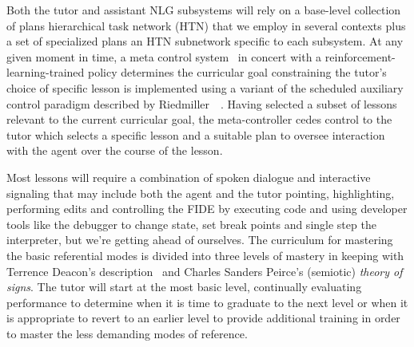 Both the tutor and assistant NLG subsystems will rely on a base-level collection of plans \emdash{} hierarchical task network (HTN) \emdash{} that we employ in several contexts plus a set of specialized plans \emdash{} an HTN subnetwork \emdash{} specific to each subsystem. At any given moment in time, a meta control system~\cite{HamricketalCoRR-17} in concert with a reinforcement-learning-trained policy determines the curricular goal constraining the tutor's choice of specific lesson is implemented using a variant of the scheduled auxiliary control paradigm described by Riedmiller~\etal{}~\cite{RiedmilleretalCoRR-18}. Having selected a subset of lessons relevant to the current curricular goal, the meta-controller cedes control to the tutor which selects a specific lesson and a suitable plan to oversee interaction with the agent over the course of the lesson.

Most lessons will require a combination of spoken dialogue and interactive signaling that may include both the agent and the tutor pointing, highlighting, performing edits and controlling the FIDE by executing code and using developer tools like the debugger to change state, set break points and single step the interpreter, but we're getting ahead of ourselves. The curriculum for mastering the basic referential modes is divided into three levels of mastery in keeping with Terrence Deacon's description~\cite{Deacon1998symbolic} and Charles Sanders Peirce's (semiotic) {\it{theory of signs}}. The tutor will start at the most basic level, continually evaluating performance to determine when it is time to graduate to the next level or when it is appropriate to revert to an earlier level to provide additional training in order to master the less demanding modes of reference.\\

